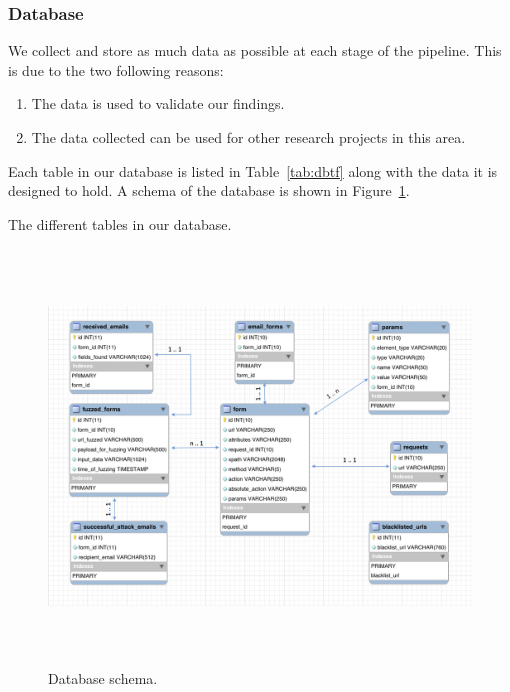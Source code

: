 \subsubsection{Database}
We collect and store as much data as possible at each stage of the pipeline. This is due to the two following reasons:
\begin{enumerate}
	\item The data is used to validate our findings.
	\item The data collected can be used for other research projects in this area.
\end{enumerate}
Each table in our database is listed in Table~\ref{tab:dbtf} along with the data it is designed to hold. A schema of the database is shown in Figure~\ref{fig:dbschema}.


\begin{table}[!htbp]
	\centering
	        
	\caption[]{The different tables in our database.}
	\label{tab:dbtf}
\end{table}

\begin{figure}[!htbp]
	\centering
	\includegraphics[width=15cm, height=11cm]{System/dbschema}
	\caption[]{Database schema.}
	\label{fig:dbschema}
\end{figure}

